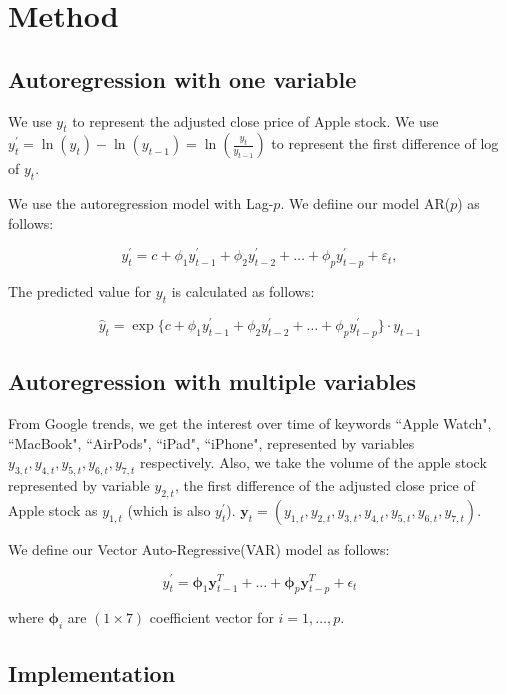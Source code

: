 \documentclass[conference,onecolumn,11pt]{IEEEtran}
\begin{document}
\section{Method}

\subsection*{Autoregression with one variable}\label{mod1}

We use $y_{t}$ to represent the adjusted close price of Apple stock.
We use $y^{'}_{t} = \ln(y_{t})-\ln(y_{t-1}) = \ln(\frac{y_{t}}{y_{t-1}})$ to represent the first difference of log of $y_{t}$.

We use the autoregression model with Lag-$p$. We defiine our model AR($p$) as follows:

\[
y^{'}_{t} = c + \phi_{1}y^{'}_{t-1} + \phi_{2}y^{'}_{t-2} + \dots + \phi_{p}y^{'}_{t-p} + \varepsilon_{t},
\]

The predicted value for $y_t$ is calculated as follows:

\[
\hat{y}_t = \exp\{c + \phi_{1}y^{'}_{t-1} + \phi_{2}y^{'}_{t-2} + \dots + \phi_{p}y^{'}_{t-p}\}\cdot y_{t-1}
\]

\subsection*{Autoregression with multiple variables}
\label{mod2}

From Google trends, we get the interest over time of keywords ``Apple Watch", ``MacBook", ``AirPods", ``iPad", ``iPhone", represented by variables $y_{3,t},y_{4,t},y_{5,t},y_{6,t},y_{7,t}$ respectively. Also, we take the volume of the apple stock represented by variable $y_{2,t}$, the first difference of the adjusted close price of Apple stock as $y_{1,t}$ (which is also $y^{'}_t$). $\mathbf{y}_t = (y_{1,t},y_{2,t},y_{3,t},y_{4,t},y_{5,t},y_{6,t},y_{7,t})$.

We define our Vector Auto-Regressive(VAR) model as follows:

\[
y^{'}_t = \boldsymbol{\phi}_1\mathbf{y}_{t-1}^T+\ldots+\boldsymbol{\phi}_p\mathbf{y}_{t-p}^T+\epsilon_t
\]

where $\boldsymbol{\phi}_i$ are $(1\times7)$ coefficient vector for $i=1,\ldots,p$.

\subsection*{Implementation}
\end{document}
